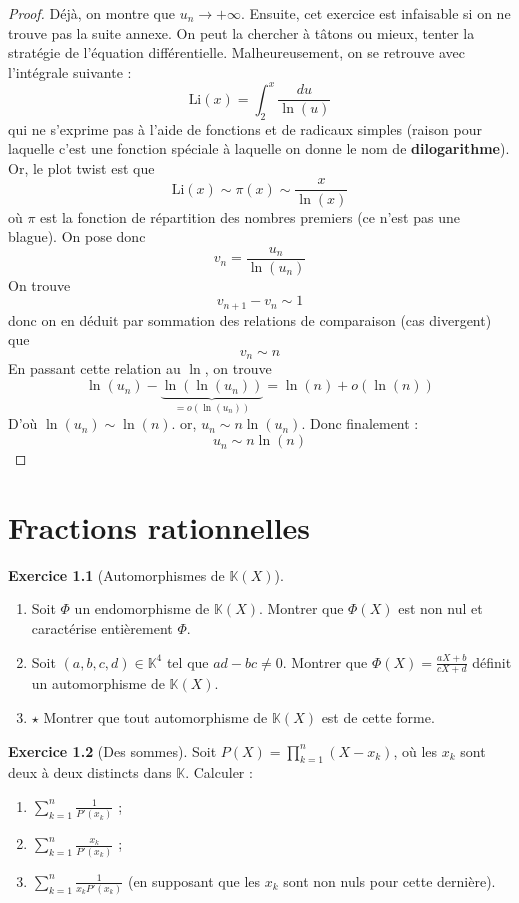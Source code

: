 \documentclass[french]{book}
\newcommand{\K}{\mathbb{K}}
\theoremstyle{definition}
\newtheorem{ex}{Exercice}[chapter]
\theoremstyle{theorem}
\theoremstyle{remark}
\begin{document}
\begin{proof}
	Déjà, on montre que $u_n\to+\infty$. Ensuite, cet exercice est infaisable si on ne trouve pas la suite annexe. On peut la chercher à tâtons ou mieux, tenter la stratégie de l'équation différentielle. Malheureusement, on se retrouve avec l'intégrale suivante : $$\text{Li}(x)=\int_{2}^{x}\frac{du}{\ln(u)}$$ qui ne s'exprime pas à l'aide de fonctions et de radicaux simples (raison pour laquelle c'est une fonction spéciale à laquelle on donne le nom de \textbf{dilogarithme}). Or, le plot twist est que $$\text{Li}(x)\sim\pi(x)\sim\frac{x}{\ln(x)}$$ où $\pi$ est la fonction de répartition des nombres premiers (ce n'est pas une blague). On pose donc $$v_n=\frac{u_n}{\ln(u_n)}$$ On trouve $$v_{n+1}-v_n\sim 1$$ donc on en déduit par sommation des relations de comparaison (cas divergent) que $$v_n\sim n$$ En passant cette relation au $\ln$, on trouve $$\ln(u_n)-\underbrace{\ln(\ln(u_n))}_{=o(\ln(u_n))}=\ln(n)+o(\ln(n))$$ D'où $\ln(u_n)\sim\ln(n)$. or, $u_n\sim n\ln(u_n)$. Donc finalement : $$u_n\sim n\ln(n)$$
\end{proof}



\chapter{Fractions rationnelles}

\begin{ex}[Automorphismes de $\K(X)$]
	\begin{enumerate}
		\item Soit $\Phi$ un endomorphisme de $\K(X)$. Montrer que $\Phi(X)$ est non nul et caractérise entièrement $\Phi$.
		\item Soit $(a,b,c,d)\in\K^4$ tel que $ad-bc\ne 0$. Montrer que $\Phi(X)=\displaystyle\frac{aX+b}{cX+d}$ définit un automorphisme de $\K(X)$.
		\item $\star$ Montrer que tout automorphisme de $\K(X)$ est de cette forme.
	\end{enumerate}
\end{ex}

\begin{ex}[Des sommes]
	Soit $P(X)=\displaystyle\prod_{k=1}^{n}(X-x_k)$, où les $x_k$ sont deux à deux distincts dans $\K$. Calculer : 
	\begin{enumerate}
		\item $\displaystyle\sum_{k=1}^{n}\frac{1}{P'(x_k)}$ ;
		\item $\displaystyle\sum_{k=1}^{n}\frac{x_k}{P'(x_k)}$ ;
		\item $\displaystyle\sum_{k=1}^{n}\frac{1}{x_kP'(x_k)}$ (en supposant que les $x_k$ sont non nuls pour cette dernière).
	\end{enumerate}
\end{ex}
\end{document}
